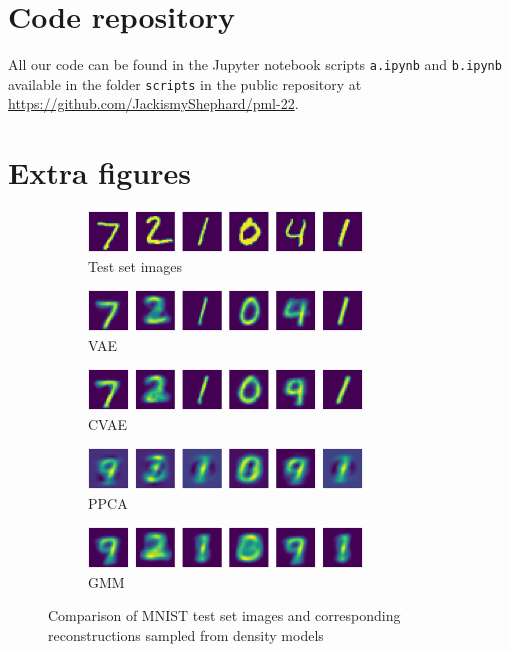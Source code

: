
\section{Code repository}
All our code can be found in the Jupyter notebook scripts \texttt{a.ipynb} and \texttt{b.ipynb} available in the folder \texttt{scripts} in the public repository at
\url{https://github.com/JackismyShephard/pml-22}.

\section{Extra figures}
\begin{figure}[!h]
	\begin{subfigure}[t]{1\textwidth}
		\centering
		\includegraphics[width = 0.8\textwidth]{figures/ppca/real}
		\caption{Test set images}
	\end{subfigure}
	\begin{subfigure}[t]{1\textwidth}
		\centering
		\includegraphics[width = 0.8\textwidth]{figures/vae/mean}
		\caption{VAE}
	\end{subfigure}
	\begin{subfigure}[t]{1\textwidth}
		\centering
		\includegraphics[width = 0.8\textwidth]{figures/cvae/mean}
		\caption{CVAE}
	\end{subfigure}
	\begin{subfigure}[t]{1\textwidth}
		\centering
		\includegraphics[width = 0.8\textwidth]{figures/ppca/mean}
		\caption{PPCA}
	\end{subfigure}
	\begin{subfigure}[t]{1\textwidth}
		\centering
		\includegraphics[width = 0.8\textwidth]{figures/gmm/mean}
		\caption{GMM}
	\end{subfigure}
	\caption{Comparison of MNIST test set images and corresponding reconstructions sampled from density models}
\end{figure}

